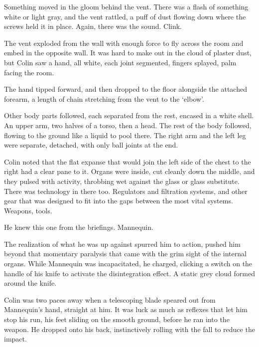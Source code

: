 Something moved in the gloom behind the vent.  There was a flash of something white or light gray, and the vent rattled, a puff of dust flowing down where the screws held it in place.  Again, there was the sound.  Clink.



The vent exploded from the wall with enough force to fly across the room and embed in the opposite wall. It was hard to make out in the cloud of plaster dust, but Colin saw a hand, all white, each joint segmented, fingers splayed, palm facing the room.



The hand tipped forward, and then dropped to the floor alongside the attached forearm, a length of chain stretching from the vent to the `elbow'.



Other body parts followed, each separated from the rest, encased in a white shell.  An upper arm, two halves of a torso, then a head.  The rest of the body followed, flowing to the ground like a liquid to pool there.  The right arm and the left leg were separate, detached, with only ball joints at the end.



Colin noted that the flat expanse that would join the left side of the chest to the right had a clear pane to it.  Organs were inside, cut cleanly down the middle, and they pulsed with activity, throbbing wet against the glass or glass substitute.  There was technology in there too.  Regulators and filtration systems, and other gear that was designed to fit into the gaps between the most vital systems.  Weapons, tools.



He knew this one from the briefings.  Mannequin.



The realization of what he was up against spurred him to action, pushed him beyond that momentary paralysis that came with the grim sight of the internal organs.  While Mannequin was incapacitated, he charged, clicking a switch on the handle of his knife to activate the disintegration effect.  A static grey cloud formed around the knife.



Colin was two paces away when a telescoping blade speared out from Mannequin's hand, straight at him.  It was luck as much as reflexes that let him stop his run, his feet sliding on the smooth ground, before he ran into the weapon.  He dropped onto his back, instinctively rolling with the fall to reduce the impact.



